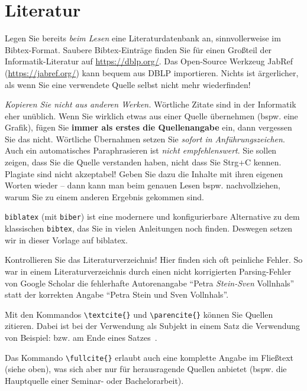 \section{Literatur}

Legen Sie bereits \textit{beim Lesen} eine Literaturdatenbank an,
sinnvollerweise im Bibtex-Format. Saubere Bibtex-Einträge finden
Sie für einen Großteil der Informatik-Literatur auf \url{https://dblp.org/}.
Das Open-Source Werkzeug JabRef (\url{https://jabref.org/}) kann bequem aus DBLP importieren.
Nichts ist ärgerlicher, als wenn Sie eine verwendete Quelle selbst nicht mehr wiederfinden!

\emph{Kopieren Sie nicht aus anderen Werken.} Wörtliche Zitate sind in der Informatik
eher unüblich. Wenn Sie wirklich etwas aus einer Quelle übernehmen (bspw.{} eine Grafik),
fügen Sie \textbf{immer als erstes die Quellenangabe} ein, dann vergessen Sie das nicht.
Wörtliche Übernahmen setzen Sie \emph{sofort in Anführungszeichen}.
Auch ein automatisches Paraphrasieren ist \emph{nicht empfehlenswert}.
Sie sollen zeigen, dass Sie die Quelle verstanden haben, nicht dass Sie
Strg+C kennen. Plagiate sind nicht akzeptabel!
Geben Sie dazu die Inhalte mit ihren eigenen Worten wieder -- dann kann man beim
genauen Lesen bspw.{} nachvollziehen, warum Sie zu einem anderen Ergebnis gekommen sind.

\texttt{biblatex} (mit \texttt{biber}) ist eine modernere und konfigurierbare Alternative zu dem
klassischen \texttt{bibtex}, das Sie in vielen Anleitungen noch finden.
Deswegen setzen wir in dieser Vorlage auf biblatex.

Kontrollieren Sie das Literaturverzeichnis! Hier finden sich oft peinliche Fehler.
So war in einem Literaturverzeichnis durch einen nicht korrigierten Parsing-Fehler
von Google Scholar die fehlerhafte Autorenangabe
\enquote{Petra \mbox{\emph{Stein-Sven}} Vollnhals} statt der korrekten Angabe
\enquote{Petra Stein und Sven Vollnhals}.

Mit den Kommandos \texttt{\textbackslash{}textcite\{\}} und 
\texttt{\textbackslash{}parencite\{\}} können Sie Quellen zitieren.
Dabei ist bei der Verwendung als Subjekt in einem Satz die Verwendung von
Beispiel: \textcite{Deininger2017} bzw.{} am Ende eines Satzes~\parencite{Voss2022}.

Das Kommando \texttt{\textbackslash{}fullcite\{\}} erlaubt auch eine komplette
Angabe im Fließtext (siehe oben), was sich aber nur für herausragende Quellen
anbietet (bspw.{} die Hauptquelle einer Seminar- oder Bachelorarbeit).

